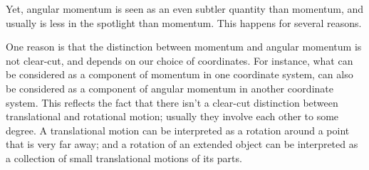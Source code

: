 \documentclass[a4paper,12pt,%
onecolumn,oneside,%
british%
]{memoir}
\renewcommand*{\|}[1][]{\nonscript\:#1\vert\nonscript\:\mathopen{}}
\begin{document}
\medskip

Yet, angular momentum is seen as an even subtler quantity than momentum, and usually is less in the spotlight than momentum. This happens for several reasons.

One reason is that the distinction between momentum and angular momentum is not clear-cut, and depends on our choice of coordinates. For instance, what can be considered as a component of momentum in one coordinate system, can also be considered as a component of angular momentum in another coordinate system. This reflects the fact that there isn't a clear-cut distinction between translational and rotational motion; usually they involve each other to some degree. A translational motion can be interpreted as a rotation around a point that is very far away; and a rotation of an extended object can be interpreted as a collection of small translational motions of its parts.
\end{document}
